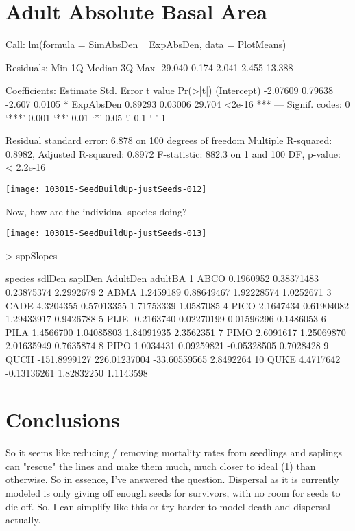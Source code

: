 \documentclass{article}
\begin{document}
\section{Adult Absolute Basal Area}
\begin{Schunk}
\begin{Soutput}
Call:
lm(formula = SimAbsDen ~ ExpAbsDen, data = PlotMeans)

Residuals:
    Min      1Q  Median      3Q     Max 
-29.040   0.174   2.041   2.455  13.388 

Coefficients:
            Estimate Std. Error t value Pr(>|t|)    
(Intercept) -2.07609    0.79638  -2.607   0.0105 *  
ExpAbsDen    0.89293    0.03006  29.704   <2e-16 ***
---
Signif. codes:  0 ‘***’ 0.001 ‘**’ 0.01 ‘*’ 0.05 ‘.’ 0.1 ‘ ’ 1

Residual standard error: 6.878 on 100 degrees of freedom
Multiple R-squared:  0.8982,	Adjusted R-squared:  0.8972 
F-statistic: 882.3 on 1 and 100 DF,  p-value: < 2.2e-16
\end{Soutput}
\end{Schunk}
\texttt{[image: 103015-SeedBuildUp-justSeeds-012]}

Now, how are the individual species doing?

\texttt{[image: 103015-SeedBuildUp-justSeeds-013]}
\begin{Schunk}
\begin{Sinput}
>   sppSlopes
\end{Sinput}
\begin{Soutput}
   species       sdlDen      saplDen     AdultDen   adultBA
1     ABCO    0.1960952   0.38371483   0.23875374 2.2992679
2     ABMA    1.2459189   0.88649467   1.92228574 1.0252671
3     CADE    4.3204355   0.57013355   1.71753339 1.0587085
4     PICO    2.1647434   0.61904082   1.29433917 0.9426788
5     PIJE   -0.2163740   0.02270199   0.01596296 0.1486053
6     PILA    1.4566700   1.04085803   1.84091935 2.3562351
7     PIMO    2.6091617   1.25069870   2.01635949 0.7635874
8     PIPO    1.0034431   0.09259821  -0.05328505 0.7028428
9     QUCH -151.8999127 226.01237004 -33.60559565 2.8492264
10    QUKE    4.4717642  -0.13136261   1.82832250 1.1143598
\end{Soutput}
\end{Schunk}


\section{Conclusions}

So it seems like reducing / removing mortality rates from seedlings and saplings can "rescue" the lines and make them much, much closer to ideal (1) than otherwise. So in essence, I've answered the question. Dispersal as it is currently modeled is only giving off enough seeds for survivors, with no room for seeds to die off. So, I can simplify like this or try harder to model death and dispersal actually. 
\end{document}
